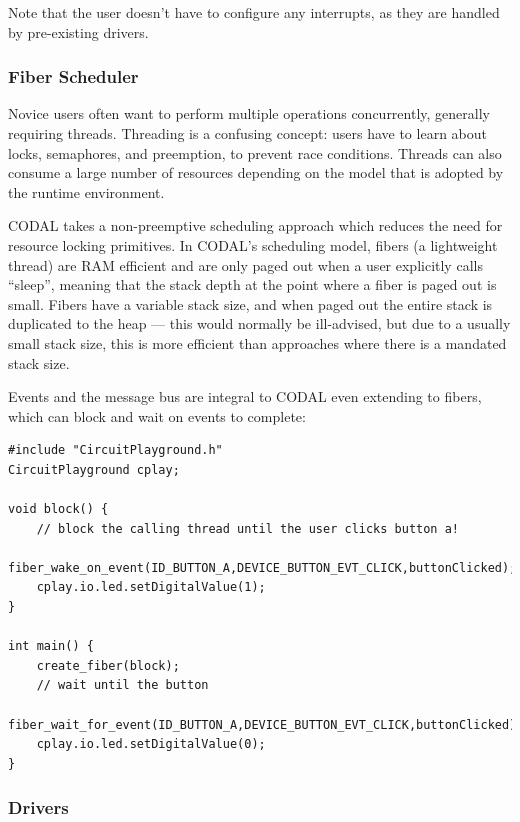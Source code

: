 Note that the user doesn't have to configure any interrupts, as they are handled by pre-existing drivers.


\subsubsection{Fiber Scheduler}

Novice users often want to perform multiple operations concurrently, generally requiring threads. Threading is a confusing concept: users have to learn about locks, semaphores, and preemption, to prevent race conditions. Threads can also consume a large number of resources depending on the model that is adopted by the runtime environment.

CODAL takes a non-preemptive scheduling approach which reduces the need for resource locking primitives. In CODAL's scheduling model, fibers (a lightweight thread) are RAM efficient and are only paged out when a user explicitly calls ``sleep'', meaning that the stack depth at the point where a fiber is paged out is small. Fibers have a variable stack size, and when paged out the entire stack is duplicated to the heap --- this would normally be ill-advised, but due to a usually small stack size, this is more efficient than approaches where there is a mandated stack size.

Events and the message bus are integral to CODAL even extending to fibers, which can block and wait on events to complete:

\begin{lstlisting}
#include "CircuitPlayground.h"
CircuitPlayground cplay;

void block() {
    // block the calling thread until the user clicks button a!
    fiber_wake_on_event(ID_BUTTON_A,DEVICE_BUTTON_EVT_CLICK,buttonClicked);
    cplay.io.led.setDigitalValue(1);
}

int main() {
    create_fiber(block);
    // wait until the button
    fiber_wait_for_event(ID_BUTTON_A,DEVICE_BUTTON_EVT_CLICK,buttonClicked);
    cplay.io.led.setDigitalValue(0);
}
\end{lstlisting}

\subsubsection{Drivers}

